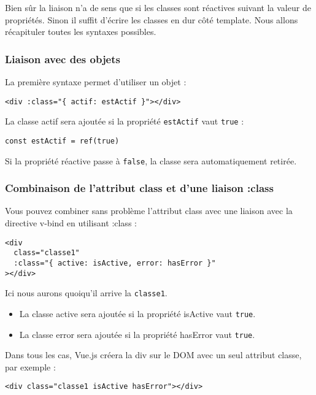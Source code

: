 Bien sûr la liaison n'a de sens que si les classes sont réactives suivant la valeur de propriétés. Sinon il suffit d'écrire les classes en dur côté {\color{monOrange}template}. Nous allons récapituler toutes les syntaxes possibles.

\subsubsection{Liaison avec des objets}
La première syntaxe permet d'utiliser un objet :
\begin{verbatim}
<div :class="{ actif: estActif }"></div>
\end{verbatim}
La classe {\color{monOrange}actif} sera ajoutée si la propriété {\tt estActif} vaut {\tt true} :
\begin{verbatim}
const estActif = ref(true)
\end{verbatim}
Si la propriété réactive passe à {\tt false}, la classe sera automatiquement retirée.

\subsubsection{Combinaison de l'attribut {\color{monOrange}class} et d'une liaison {\color{monOrange}:class}}
Vous pouvez combiner sans problème l'attribut {\color{monOrange}class} avec une liaison avec la directive {\color{monOrange}v-bind} en utilisant {\color{monOrange}:class} :
\begin{verbatim}
<div
  class="classe1"
  :class="{ active: isActive, error: hasError }"
></div>
\end{verbatim}
Ici nous aurons quoiqu'il arrive la {\tt classe1}.
\begin{itemize}
\item La classe {\color{monOrange}active} sera ajoutée si la propriété {\color{monOrange}isActive} vaut {\tt true}.
\item La classe {\color{monOrange}error} sera ajoutée si la propriété {\color{monOrange}hasError} vaut {\tt true}.
\end{itemize}
Dans tous les cas, Vue.js créera la div sur le DOM avec un seul attribut classe, par exemple :
\begin{verbatim}
<div class="classe1 isActive hasError"></div>
\end{verbatim}

